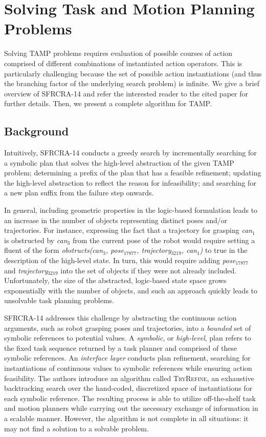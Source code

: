 \section{Solving Task and Motion Planning Problems}
Solving TAMP problems requires evaluation of
possible courses of action comprised of different combinations of
instantiated action operators. This is particularly challenging
because the set of possible action instantiations (and thus the
branching factor of the underlying search problem) is infinite.
We give a brief overview of SFRCRA-14 and
refer the interested reader to the cited paper for further details.
Then, we present a complete algorithm for TAMP.

\subsection{Background}
Intuitively, SFRCRA-14 conducts a greedy search by incrementally searching for a symbolic
plan that solves the high-level abstraction of the given TAMP problem;
determining a prefix of the plan that has a feasible refinement; updating the high-level abstraction to reflect the
reason for infeasibility; and searching for a new plan suffix from the failure step onwards.

In general, including geometric properties in the logic-based formulation leads to an
increase in the number of objects representing distinct poses and/or trajectories. For
instance, expressing the fact that a trajectory for grasping \emph{can$_1$} is obstructed by
\emph{can$_3$} from the current pose of the robot would require setting a fluent of the
form \emph{obstructs(can$_3$, pose$_{17877}$, trajectory$_{3219}$, can$_1$)} to true in
the description of the high-level state. In turn, this would require adding
\emph{pose$_{17877}$} and \emph{trajectory$_{3219}$} into the set of objects if they were
not already included. Unfortunately, the size of the abstracted, logic-based state space
grows exponentially with the number of objects, and such an approach quickly leads to
unsolvable task planning problems.

SFRCRA-14 addresses this challenge by abstracting the continuous action
arguments, such as robot grasping poses and trajectories, into a
\emph{bounded} set of symbolic references to potential values. A
\emph{symbolic}, or \emph{high-level}, plan refers to the fixed task
sequence returned by a task planner and comprised of these symbolic
references. An \emph{interface layer} conducts plan refinement, searching for instantiations of
continuous values to symbolic references while ensuring action
feasibility. The authors introduce an algorithm called \textsc{TryRefine}, an exhaustive backtracking search over
the hand-coded, discretized space of instantiations for each symbolic reference.
The resulting process is able to utilize off-the-shelf task and motion
planners while carrying out the necessary exchange of information in a
scalable manner. However, the algorithm is not complete in all situations: it may
not find a solution to a solvable problem.

